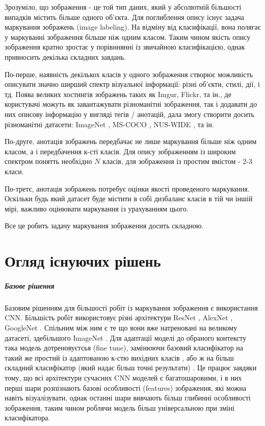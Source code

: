 \documentclass{udstu}
\begin{document}
Зрозуміло, що зображення - це той тип даних, який у абсолютній більшості випадків містить більше одного об'єкта.
Для поглиблення опису існує задача маркування зображень (image labeling). На відміну від
класифікації, вона полягає у маркуванні зображення більше ніж одним класом. Таким чином
якість опису зображення кратно зростає у порівннянні із звичайною класифікацією,
однак привносить декілька складних завдань.

По-перше, наявність декількох класів у одного зображення створює можливість
описувати значно ширший спектр візуальної інформації: різні об'єкти, стилі, дії, і тд.
Поява великих хостингів зображень таких як Imgur, Flickr, та ін., де користувачі можуть
як завантажувати різноманітні зображення, так і додавати до них описову інформацію у вигляді
тегів / анотацій, дала змогу створити досить різноманітні датасети: ImageNet \cite{deng2009imagenet},
MS-COCO \cite{cocodataset}, NUS-WIDE \cite{nus-wide-civr09}, та ін.

По-друге, анотація зображень передбачає не лише маркування більше ніж одним класом,
а і передбачення к-сті класів. Для опису зображенням із широким спектром понятть необхідно $N$ класів,
для зображення із простим вмістом - 2-3 класи.

По-третє, анотація зображень потребує оцінки якості проведеного маркування. Оскільки будь який
датасет буде містити в собі дизбаланс класів в тій чи іншій мірі, важливо оцінювати маркування із
урахуванням цього.

Все це робить задачу маркування зображення досить складною.


\chapter{Огляд існуючих рішень}

\paragraph{\textbf{Базове рішення}\\}

Базовим рішенням для більшості робіт із маркування зображення є використання CNN.
Більшість робіт використовує різні архітектури ResNet \cite{resnet}, AlexNet \cite{alexnet}, GoogleNet \cite{googlenet}.
Спільним між ним є те що вони вже натреновані на великому датасеті, здебільшого ImageNet \cite{deng2009imagenet}.
Для адаптації моделі до обраного контексту така модель дотреновуєтсья (fine tune), замінюючи базовий класифікатор на
такий же простий із адаптованою к-стю вихідних класів \cite{cnn-labeling-1}, або ж на більш складний класифікатор (який надає більш точні результати) \cite{cnn-labeling-2}. Це працює завдяки тому, що всі архітектури сучасних CNN моделей є багатошаровими,
і в них перші шари розпізнають базові особливості (features) зображення, які можна навіть візуалізувати, однак
останні шари вивчають більш глибинні особливості зображення, таким чином роблячи модель більш універсальною при зміні
класифікатора.
\end{document}
